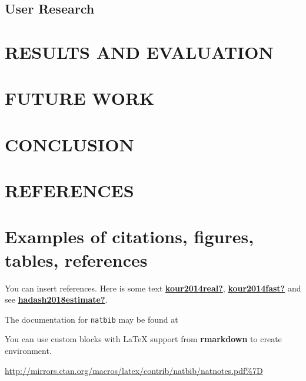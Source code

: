 \documentclass{article}
\begin{document}
\hypertarget{user-research}{%
\subsection{User Research}\label{user-research}}

\hypertarget{results-and-evaluation}{%
\section{RESULTS AND EVALUATION}\label{results-and-evaluation}}

\label{sec:headings}

\hypertarget{future-work}{%
\section{FUTURE WORK}\label{future-work}}

\label{sec:headings}

\hypertarget{conclusion}{%
\section{CONCLUSION}\label{conclusion}}

\label{sec:headings}

\hypertarget{references}{%
\section{REFERENCES}\label{references}}

\label{sec:headings}

\hypertarget{examples-of-citations-figures-tables-references}{%
\section{Examples of citations, figures, tables,
references}\label{examples-of-citations-figures-tables-references}}

\label{sec:others}

You can insert references. Here is some text
\protect\hyperlink{ref-kour2014real}{\textbf{kour2014real?}},
\protect\hyperlink{ref-kour2014fast}{\textbf{kour2014fast?}} and see
\protect\hyperlink{ref-hadash2018estimate}{\textbf{hadash2018estimate?}}.

The documentation for \verb+natbib+ may be found at

You can use custom blocks with LaTeX support from \textbf{rmarkdown} to
create environment.

\begin{center}
\url{http://mirrors.ctan.org/macros/latex/contrib/natbib/natnotes.pdf\%7D}

\end{center}
\end{document}
